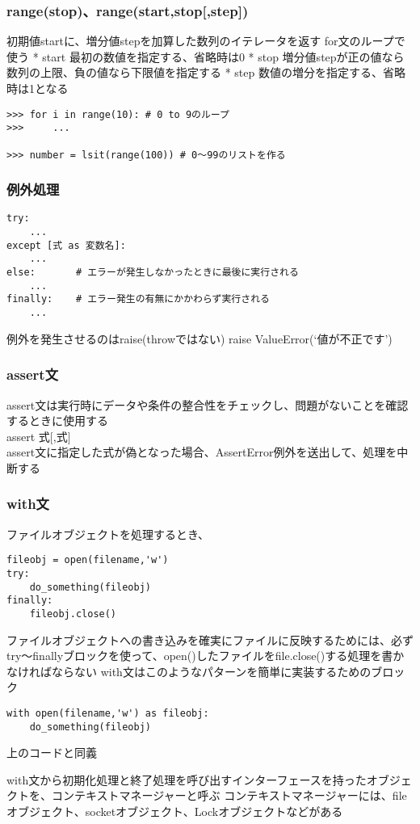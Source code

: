 \documentclass[a4j,here,10pt,oneside,openany]{jsbook}
\begin{document}
\subsubsection{range(stop)、range(start,stop{[},step{]})}\label{rangestoprangestartstopstep}

初期値startに、増分値stepを加算した数列のイテレータを返す
for文のループで使う * start 最初の数値を指定する、省略時は0 * stop
増分値stepが正の値なら数列の上限、負の値なら下限値を指定する * step
数値の増分を指定する、省略時は1となる

\begin{verbatim}
>>> for i in range(10): # 0 to 9のループ
>>>     ...

>>> number = lsit(range(100)) # 0〜99のリストを作る
\end{verbatim}

\subsubsection{例外処理}\label{ux4f8bux5916ux51e6ux7406}
\begin{framed}
\begin{verbatim}
try:
    ...
except [式 as 変数名]:
    ...
else:       # エラーが発生しなかったときに最後に実行される
    ...
finally:    # エラー発生の有無にかかわらず実行される
    ...
\end{verbatim}
\end{framed}
例外を発生させるのはraise(throwではない) raise
ValueError(`値が不正です')

\subsubsection{assert文}

assert文は実行時にデータや条件の整合性をチェックし、問題がないことを確認するときに使用する\\

assert 式$[$,式$]$\\

assert文に指定した式が偽となった場合、AssertError例外を送出して、処理を中断する\\
\subsubsection{with文}

ファイルオブジェクトを処理するとき、
\begin{framed}
\begin{verbatim}
fileobj = open(filename,'w')
try:
    do_something(fileobj)
finally:
    fileobj.close()
\end{verbatim}
\end{framed}
ファイルオブジェクトへの書き込みを確実にファイルに反映するためには、必ずtry〜finallyブロックを使って、open()したファイルをfile.close()する処理を書かなければならない
with文はこのようなパターンを簡単に実装するためのブロック
\begin{framed}
\begin{verbatim}
with open(filename,'w') as fileobj:
    do_something(fileobj)
\end{verbatim}
\end{framed}
上のコードと同義

with文から初期化処理と終了処理を呼び出すインターフェースを持ったオブジェクトを、コンテキストマネージャーと呼ぶ
コンテキストマネージャーには、fileオブジェクト、socketオブジェクト、Lockオブジェクトなどがある
\end{document}
